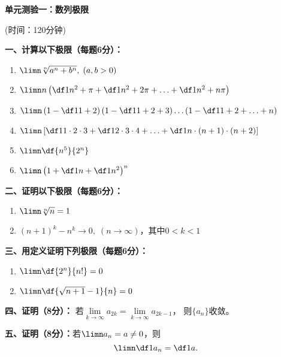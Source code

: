 \begin{center}
	{\Large\bf 单元测验一：数列极限}
	
	(时间：120分钟)
\end{center}

{\bf 一、计算以下极限（每题6分）：}
\begin{enumerate}[(1)]
  \setlength{\itemindent}{1cm}
  \item $\limn\sqrt[n]{a^n+b^n},\;(a,b>0)$
  \item $\limn n\left(\df1{n^2+\pi}+\df1{n^2+2\pi}+\ldots+\df1{n^2+n\pi}\right)$
  \item $\limn\left(1-\df 1{1+2}\right)\left(1-\df
  1{1+2+3}\right)\ldots\left(1-\df 1{1+2+\ldots+n}\right)$
  \item $\limn\left[\df1{1\cdot 2\cdot 3}+\df1{2\cdot 3\cdot 4}+\ldots+
  \df1{n\cdot (n+1)\cdot (n+2)}\right]$
  \item $\limn\df{n^5}{2^n}$
  \item $\limn\left(1+\df1n+\df 1{n^2}\right)^n$
\end{enumerate}

{\bf 二、证明以下极限（每题6分）：}
\begin{enumerate}[(1)]
  \setlength{\itemindent}{1cm}
  \item $\limn\sqrt[n]n=1$
  \item $(n+1)^k-n^k\to 0,\;(n\to\infty)$，其中$0<k<1$
\end{enumerate}

{\bf 三、用定义证明下列极限（每题6分）：}
\begin{enumerate}[(1)]
  \setlength{\itemindent}{1cm}
  \item $\limn\df{2^n}{n!}=0$
  \item $\limn\df{\sqrt{n+1}-1}{n}=0$
\end{enumerate}

{\bf 四、证明（8分）：}
若$\lim\limits_{k\to\infty}a_{2k}=\lim\limits_{k\to\infty}a_{2k-1}$，
则$\{a_n\}$收敛。

{\bf 五、证明（8分）：}若$\limn a_n=a\ne0$，则
$$\limn\df1{a_n}=\df1a.$$

% 

